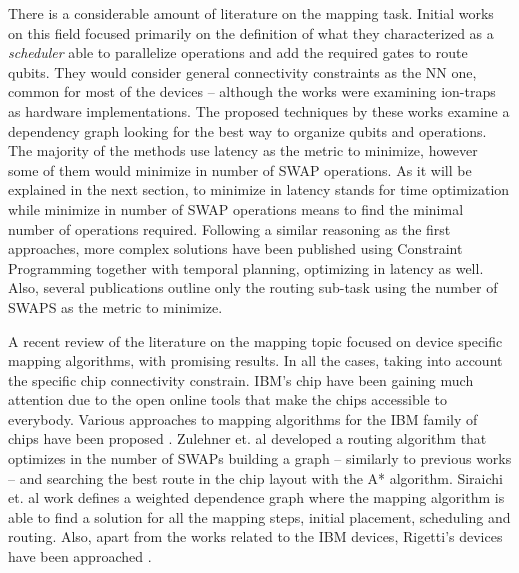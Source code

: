 There is a considerable amount of literature on the mapping task.
Initial works on this field \cite{Metodi_2006,Whitney_2007,Bahreini_2015} focused primarily on the definition of what they characterized as a \emph{scheduler} able to parallelize operations and add the required gates to route qubits.
They would consider general connectivity constraints as the NN one, common for most of the devices -- although the works were examining ion-traps as hardware implementations.
The proposed techniques by these works examine a dependency graph looking for the best way to organize qubits and operations.
The majority of the methods use latency as the metric to minimize, however some of them \cite{Farghadan_2017} would minimize in number of SWAP operations.
As it will be explained in the next section, to minimize in latency stands for time optimization while minimize in number of SWAP operations means to find the minimal number of operations required.
Following a similar reasoning as the first approaches, more complex solutions \cite{booth18:compar_integ_const_progr_tempor} have been published using Constraint Programming together with temporal planning, optimizing in latency as well.
Also, several publications \cite{Lye_2015,Wille_2016} outline only the routing sub-task using the number of SWAPS as the metric to minimize.

A recent review of the literature on the mapping topic focused on device specific mapping algorithms, with promising results.
In all the cases, taking into account the specific chip connectivity constrain.
IBM's chip have been gaining much attention due to the open online tools that make the chips accessible to everybody.
Various approaches to mapping algorithms for the IBM family of chips have been proposed \cite{zulehner17:effic_method_mappin_quant_circuit,Siraichi_2018,mckay18:qiskit_backen_specif_openq_openp_exper,Dueck_2018}.
Zulehner et. al \cite{zulehner17:effic_method_mappin_quant_circuit} developed a routing algorithm that optimizes in the number of SWAPs building a graph -- similarly to previous works --  and searching the best route in the chip layout with the A* algorithm.
Siraichi et. al \cite{Siraichi_2018} work defines a weighted dependence graph where the mapping algorithm is able to find a solution for all the mapping steps, initial placement, scheduling and routing.
Also, apart from the works related to the IBM devices, Rigetti's devices have been approached \cite{Venturelli_2018}.

